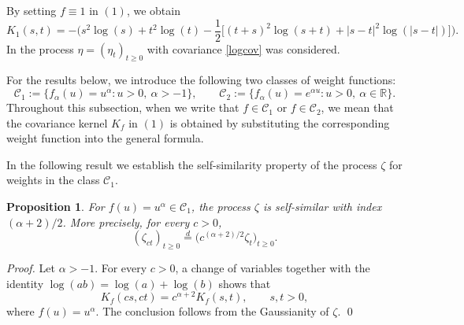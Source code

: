 \documentclass[preprint,12pt,authoryear]{elsarticle}
\newtheorem{prop}{Proposition}
\begin{document}
By setting \(f\equiv 1\) in \((1)\), we obtain
\begin{equation}\label{logcov}
   {K}_1(s,t)= -\Bigg(s^{2}\log(s)+t^{2}\log(t)-\frac{1}{2}\Bigg[(t+s)^{2}\log(s+t)+|s-t|^{2}\log(|s-t|)\Bigg]\Bigg).
\end{equation}
In \cite{BGT2007} the process $\eta=(\eta_t)_{t\geq 0}$ with covariance \eqref{logcov} was considered.

For the results below, we introduce the following two classes of weight functions:
\[
\mathcal{C}_1:=\{f_{\alpha}(u)=u^{\alpha}: u>0,\ \alpha>-1\},
\qquad
\mathcal{C}_2:=\{f_{\alpha}(u)=e^{\alpha u}: u>0,\ \alpha\in\mathbb{R}\}.
\]
Throughout this subsection, when we write that \(f\in\mathcal{C}_1\) or \(f\in\mathcal{C}_2\), we mean that the covariance kernel \(K_f\) in \((1)\) is obtained by substituting the corresponding weight function into the general formula.

In the following result we establish the self-similarity property of the process $\zeta$ for weights in the class $\mathcal{C}_1$.

\begin{prop}\label{auto}
For \(f(u)=u^\alpha\in\mathcal{C}_1\), the process \(\zeta\) is self-similar with index \((\alpha+2)/2\). More precisely, for every \(c>0\),
\[
(\zeta_{ct})_{t\geq 0}\overset{d}= \bigl(c^{(\alpha+2)/2}\zeta_t\bigr)_{t\geq 0}.
\]
\end{prop}

\begin{proof}
Let \(\alpha>-1\). For every \(c>0\), a change of variables together with the identity \(\log(ab)=\log(a)+\log(b)\) shows that
\[
K_f(cs,ct)=c^{\alpha+2}K_f(s,t), \qquad s,t>0,
\]
where \(f(u)=u^\alpha\). The conclusion follows from the Gaussianity of \(\zeta\). \qed
\end{proof}
\end{document}
